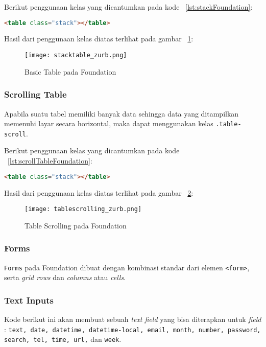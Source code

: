 \noindent Berikut penggunaan kelas yang dicantumkan pada kode ~\ref{lst:stackFoundation}:
\begin{lstlisting}[style=customhtml, language=HTML,  basicstyle=\ttfamily, frame=single, columns=fullflexible, keepspaces=true, breaklines=true, showstringspaces=false, label={lst:stackFoundation}, caption=Tabel stack pada foundation 6.] 
<table class="stack"></table>
\end{lstlisting}
\noindent Hasil dari penggunaan kelas diatas terlihat pada gambar ~\ref{fig:stackTableFoundation}:
\begin{figure} [H]
	\centering  
	\texttt{[image: stacktable\_zurb.png]}  
	\caption{Basic Table pada Foundation}
	\label{fig:stackTableFoundation}
\end{figure}

\subsubsection{Scrolling Table}
Apabila suatu tabel memiliki banyak data sehingga data yang ditampilkan memenuhi layar secara horizontal, maka dapat menggunakan kelas \texttt{.table-scroll}.

\noindent Berikut penggunaan kelas yang dicantumkan pada kode ~\ref{lst:scrollTableFoundation}:
\begin{lstlisting}[style=customhtml, language=HTML,  basicstyle=\ttfamily, frame=single, columns=fullflexible, keepspaces=true, breaklines=true, showstringspaces=false, label={lst:scrollTableFoundation}, caption=Scroll tabel pada foundation 6.] 
<table class="stack"></table>
\end{lstlisting}
\noindent Hasil dari penggunaan kelas diatas terlihat pada gambar ~\ref{fig:scrollTableFoundation}:
\begin{figure} [H]
	\centering  
	\texttt{[image: tablescrolling\_zurb.png]}  
	\caption{Table Scrolling pada Foundation}
	\label{fig:scrollTableFoundation}
\end{figure}


\subsubsection{Forms}
\texttt{Forms} pada Foundation dibuat dengan kombinasi standar dari elemen \texttt{<form>}, serta \textit{grid rows} dan \textit{columns} atau \textit{cells}. 

\subsubsection{Text Inputs}
Kode berikut ini akan membuat sebuah \textit{text field} yang bisa diterapkan untuk \textit{field} : \texttt{text, date, datetime, datetime-local, email, month, number, password, search, tel, time, url,} dan \texttt{week}.\\

